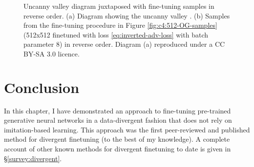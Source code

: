 \begin{figure}[!htbp]
  \centering
  \hfill
  \caption[Uncanny valley diagram juxtaposed with samples from fine-tuning process]{Uncanny valley diagram juxtaposed with fine-tuning samples in reverse order. (a) Diagram showing the uncanny valley \citep{mori1970uncanny}. (b) Samples from the fine-tuning procedure in Figure \ref{fig:c4:512-OG-samples} (512x512 finetuned with loss \ref{eq:inverted-adv-loss} with batch parameter 8) in reverse order. Diagram (a) reproduced under a CC BY-SA 3.0 licence. }
  \label{fig:c4:uncanny-valley-comparison}
\end{figure}

\section{Conclusion}

In this chapter, I have demonstrated an approach to fine-tuning pre-trained generative neural networks in a data-divergent fashion that does not rely on imitation-based learning.
This approach was the first peer-reviewed and published method for divergent finetuning (to the best of my knowledge).
A complete account of other known methods for divergent finetuning to date is given in \S \ref{survey:divergent}.

